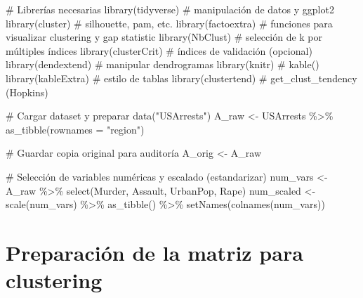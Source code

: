 \documentclass[
  spanish,
  11pt,
  a4paper,
  DIV=11,
  numbers=noendperiod]{scrartcl}
\newenvironment{Shaded}{\begin{snugshade}}{\end{snugshade}}
\newcommand{\AttributeTok}[1]{\textcolor[rgb]{0.40,0.45,0.13}{#1}}
\newcommand{\CommentTok}[1]{\textcolor[rgb]{0.37,0.37,0.37}{#1}}
\newcommand{\FunctionTok}[1]{\textcolor[rgb]{0.28,0.35,0.67}{#1}}
\newcommand{\NormalTok}[1]{\textcolor[rgb]{0.00,0.23,0.31}{#1}}
\newcommand{\OtherTok}[1]{\textcolor[rgb]{0.00,0.23,0.31}{#1}}
\newcommand{\SpecialCharTok}[1]{\textcolor[rgb]{0.37,0.37,0.37}{#1}}
\newcommand{\StringTok}[1]{\textcolor[rgb]{0.13,0.47,0.30}{#1}}
\begin{document}
\begin{Shaded}
\begin{Highlighting}[numbers=left,,]
\CommentTok{\# Librerías necesarias}
\FunctionTok{library}\NormalTok{(tidyverse)    }\CommentTok{\# manipulación de datos y ggplot2}
\FunctionTok{library}\NormalTok{(cluster)      }\CommentTok{\# silhouette, pam, etc.}
\FunctionTok{library}\NormalTok{(factoextra)   }\CommentTok{\# funciones para visualizar clustering y gap statistic}
\FunctionTok{library}\NormalTok{(NbClust)      }\CommentTok{\# selección de k por múltiples índices}
\FunctionTok{library}\NormalTok{(clusterCrit)  }\CommentTok{\# índices de validación (opcional)}
\FunctionTok{library}\NormalTok{(dendextend)   }\CommentTok{\# manipular dendrogramas}
\FunctionTok{library}\NormalTok{(knitr)        }\CommentTok{\# kable()}
\FunctionTok{library}\NormalTok{(kableExtra)   }\CommentTok{\# estilo de tablas}
\FunctionTok{library}\NormalTok{(clustertend)  }\CommentTok{\# get\_clust\_tendency (Hopkins)}

\CommentTok{\# Cargar dataset y preparar}
\FunctionTok{data}\NormalTok{(}\StringTok{"USArrests"}\NormalTok{)}
\NormalTok{A\_raw }\OtherTok{\textless{}{-}}\NormalTok{ USArrests }\SpecialCharTok{\%\textgreater{}\%} \FunctionTok{as\_tibble}\NormalTok{(}\AttributeTok{rownames =} \StringTok{"region"}\NormalTok{)}

\CommentTok{\# Guardar copia original para auditoría}
\NormalTok{A\_orig }\OtherTok{\textless{}{-}}\NormalTok{ A\_raw}

\CommentTok{\# Selección de variables numéricas y escalado (estandarizar)}
\NormalTok{num\_vars }\OtherTok{\textless{}{-}}\NormalTok{ A\_raw }\SpecialCharTok{\%\textgreater{}\%} \FunctionTok{select}\NormalTok{(Murder, Assault, UrbanPop, Rape)}
\NormalTok{num\_scaled }\OtherTok{\textless{}{-}} \FunctionTok{scale}\NormalTok{(num\_vars) }\SpecialCharTok{\%\textgreater{}\%} \FunctionTok{as\_tibble}\NormalTok{() }\SpecialCharTok{\%\textgreater{}\%} \FunctionTok{setNames}\NormalTok{(}\FunctionTok{colnames}\NormalTok{(num\_vars))}
\end{Highlighting}
\end{Shaded}

\section{Preparación de la matriz para
clustering}\label{preparaciuxf3n-de-la-matriz-para-clustering}
\end{document}
